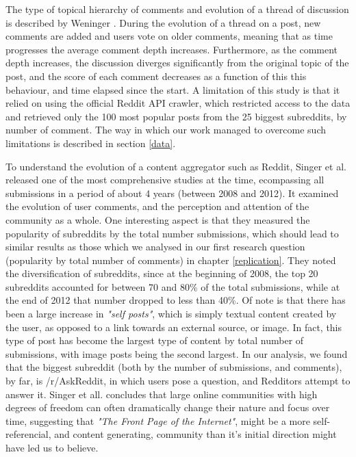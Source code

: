 \documentclass[bsc,frontabs,twoside,singlespacing,parskip,deptreport]{infthesis}
\begin{document}
The type of topical hierarchy of comments and evolution of a thread of discussion is described by Weninger \cite{WeningerTim2014Aeos}. During the evolution of a thread on a post, new comments are added and users vote on older comments, meaning that as time progresses the average comment depth increases. Furthermore, as the comment depth increases, the discussion diverges significantly from the original topic of the post, and the score of each comment decreases as a function of this this behaviour, and time elapsed since the start. A limitation of this study is that it relied on using the official Reddit API crawler, which restricted access to the data and retrieved only the 100 most popular posts from the 25 biggest subreddits, by number of comment. The way in which our work managed to overcome such limitations is described in section \ref{data}.

To understand the evolution of a content aggregator such as Reddit, Singer et al. \cite{DBLP:journals/corr/SingerFMZS14} released one of the most comprehensive studies at the time, ecompassing all submissions in a period of about 4 years (between 2008 and 2012). It examined the evolution of user comments, and the perception and attention of the community as a whole. One interesting aspect is that they measured the popularity of subreddits by the total number submissions, which should lead to similar results as those which we analysed in our first research question (popularity by total number of comments) in chapter \ref{replication}. They noted the diversification of subreddits, since at the beginning of 2008, the top 20 subreddits accounted for between 70 and 80\% of the total submissions, while at the end of 2012 that number dropped to less than 40\%. Of note is that there has been a large increase in \textit{"self posts"}, which is simply textual content created by the user, as opposed to a link towards an external source, or image. In fact, this type of post has become the largest type of content by total number of submissions, with image posts being the second largest. In our analysis, we found that the biggest subreddit (both by the number of submissions, and comments), by far, is /r/AskReddit, in which users pose a question, and Redditors attempt to answer it. Singer et all. \cite{DBLP:journals/corr/SingerFMZS14} concludes that large online communities with high degrees of freedom can often dramatically change their nature and focus over time, suggesting that \textit{"The Front Page of the Internet"}, might be a more self-referencial, and content generating, community than it's initial direction might have led us to believe.
\end{document}
